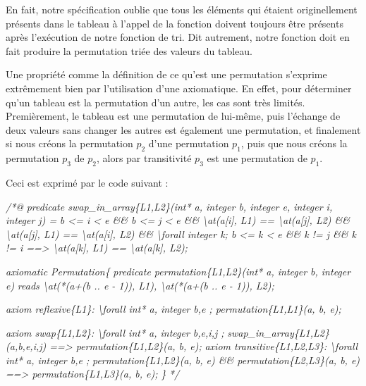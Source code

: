 \documentclass[12pt,francais,]{scrbook}
\newenvironment{Shaded}{}{}
\newcommand{\CommentTok}[1]{\textcolor[rgb]{0.38,0.63,0.69}{\textit{{#1}}}}
\begin{document}
En fait, notre spécification oublie que tous les éléments qui étaient
originellement présents dans le tableau à l'appel de la fonction doivent
toujours être présents après l'exécution de notre fonction de tri. Dit
autrement, notre fonction doit en fait produire la permutation triée des
valeurs du tableau.

Une propriété comme la définition de ce qu'est une permutation s'exprime
extrêmement bien par l'utilisation d'une axiomatique. En effet, pour
déterminer qu'un tableau est la permutation d'un autre, les cas sont
très limités. Premièrement, le tableau est une permutation de lui-même,
puis l'échange de deux valeurs sans changer les autres est également une
permutation, et finalement si nous créons la permutation \(p_2\) d'une
permutation \(p_1\), puis que nous créons la permutation \(p_3\) de
\(p_2\), alors par transitivité \(p_3\) est une permutation de \(p_1\).

Ceci est exprimé par le code suivant :

\begin{footnotesize}\begin{Shaded}
\begin{Highlighting}[]
\CommentTok{/*@}
\CommentTok{  predicate swap_in_array\{L1,L2\}(int* a, integer b, integer e, integer i, integer j) =}
\CommentTok{    b <= i < e && b <= j < e &&}
\CommentTok{    \textbackslash{}at(a[i], L1) == \textbackslash{}at(a[j], L2) && \textbackslash{}at(a[j], L1) == \textbackslash{}at(a[i], L2) &&}
\CommentTok{    \textbackslash{}forall integer k; b <= k < e && k != j && k != i ==> \textbackslash{}at(a[k], L1) == \textbackslash{}at(a[k], L2);}

\CommentTok{  axiomatic Permutation\{}
\CommentTok{    predicate permutation\{L1,L2\}(int* a, integer b, integer e)}
\CommentTok{     reads \textbackslash{}at(*(a+(b .. e - 1)), L1), \textbackslash{}at(*(a+(b .. e - 1)), L2);}

\CommentTok{    axiom reflexive\{L1\}: }
\CommentTok{      \textbackslash{}forall int* a, integer b,e ; permutation\{L1,L1\}(a, b, e);}

\CommentTok{    axiom swap\{L1,L2\}:}
\CommentTok{      \textbackslash{}forall int* a, integer b,e,i,j ;}
\CommentTok{        swap_in_array\{L1,L2\}(a,b,e,i,j) ==> permutation\{L1,L2\}(a, b, e);}
\CommentTok{    }
\CommentTok{    axiom transitive\{L1,L2,L3\}:}
\CommentTok{      \textbackslash{}forall int* a, integer b,e ; }
\CommentTok{        permutation\{L1,L2\}(a, b, e) && permutation\{L2,L3\}(a, b, e) ==> permutation\{L1,L3\}(a, b, e);}
\CommentTok{  \}}
\CommentTok{*/}
\end{Highlighting}
\end{Shaded}\end{footnotesize}
\end{document}
